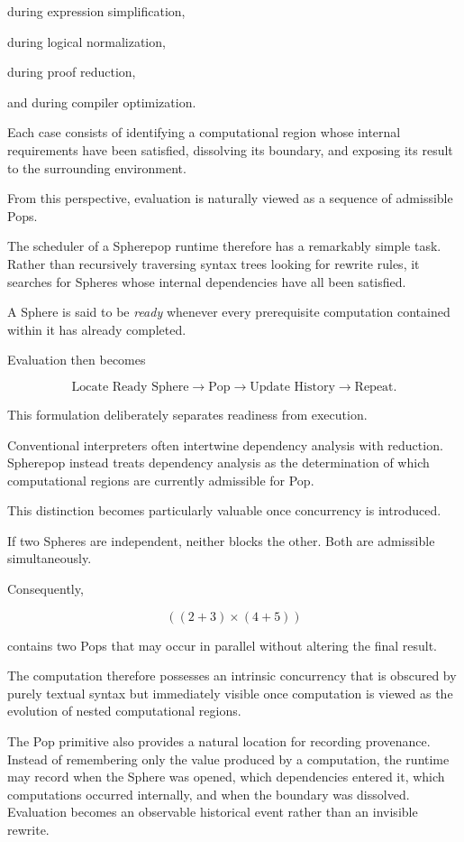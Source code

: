 \documentclass[12pt,oneside]{article}
\theoremstyle{definition}
\theoremstyle{remark}
\begin{document}
during expression simplification,

during logical normalization,

during proof reduction,

and during compiler optimization.

Each case consists of identifying a computational region whose internal
requirements have been satisfied, dissolving its boundary, and exposing its
result to the surrounding environment.

From this perspective, evaluation is naturally viewed as a sequence of
admissible Pops.

The scheduler of a Spherepop runtime therefore has a remarkably simple task.
Rather than recursively traversing syntax trees looking for rewrite rules, it
searches for Spheres whose internal dependencies have all been satisfied.

A Sphere is said to be \emph{ready} whenever every prerequisite computation
contained within it has already completed.

Evaluation then becomes

\[
\text{Locate Ready Sphere}
\longrightarrow
\text{Pop}
\longrightarrow
\text{Update History}
\longrightarrow
\text{Repeat}.
\]

This formulation deliberately separates readiness from execution.

Conventional interpreters often intertwine dependency analysis with reduction.
Spherepop instead treats dependency analysis as the determination of which
computational regions are currently admissible for Pop.

This distinction becomes particularly valuable once concurrency is introduced.

If two Spheres are independent, neither blocks the other. Both are admissible
simultaneously.

Consequently,

\[
((2+3)\times(4+5))
\]

contains two Pops that may occur in parallel without altering the final
result.

The computation therefore possesses an intrinsic concurrency that is obscured
by purely textual syntax but immediately visible once computation is viewed as
the evolution of nested computational regions.

The Pop primitive also provides a natural location for recording provenance.
Instead of remembering only the value produced by a computation, the runtime
may record when the Sphere was opened, which dependencies entered it, which
computations occurred internally, and when the boundary was dissolved.
Evaluation becomes an observable historical event rather than an invisible
rewrite.
\end{document}
